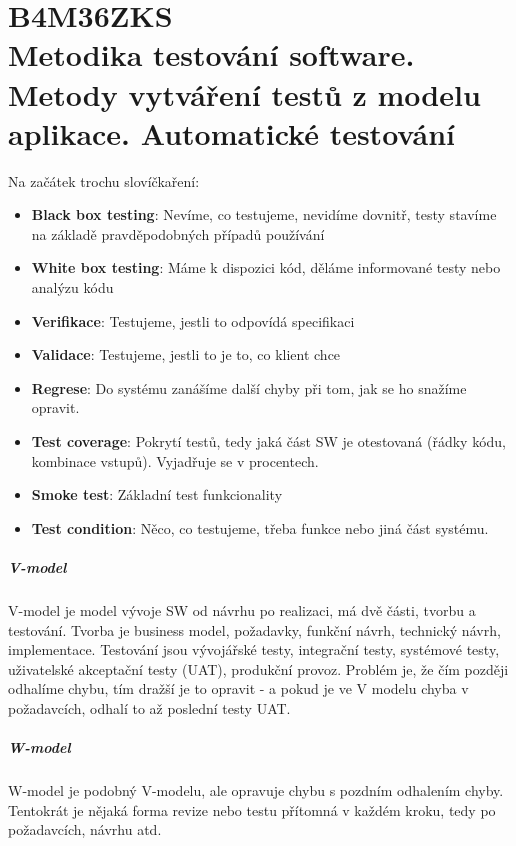\chapter[Zajištění kvality software]{B4M36ZKS \\[1ex]\Large{Metodika testování software. Metody vytváření testů z modelu aplikace. Automatické testování}}

Na začátek trochu slovíčkaření:

\begin{itemize}
\item \textbf{Black box testing}: Nevíme, co testujeme, nevidíme dovnitř, testy stavíme na základě pravděpodobných případů používání
\item \textbf{White box testing}: Máme k dispozici kód, děláme informované testy nebo analýzu kódu
\item \textbf{Verifikace}: Testujeme, jestli to odpovídá specifikaci
\item \textbf{Validace}: Testujeme, jestli to je to, co klient chce
\item \textbf{Regrese}: Do systému zanášíme další chyby při tom, jak se ho snažíme opravit.
\item \textbf{Test coverage}: Pokrytí testů, tedy jaká část SW je otestovaná (řádky kódu, kombinace vstupů). Vyjadřuje se v procentech.
\item \textbf{Smoke test}: Základní test funkcionality
\item \textbf{Test condition}: Něco, co testujeme, třeba funkce nebo jiná část systému. 
\end{itemize}

\paragraph{V-model} V-model je model vývoje SW od návrhu po realizaci, má dvě části, tvorbu a testování. Tvorba je business model, požadavky, funkční návrh, technický návrh, implementace. Testování jsou vývojářské testy, integrační testy, systémové testy, uživatelské akceptační testy (UAT), produkční provoz. Problém je, že čím později odhalíme chybu, tím dražší je to opravit - a pokud je ve V modelu chyba v požadavcích, odhalí to až poslední testy UAT.

\paragraph{W-model} W-model je podobný V-modelu, ale opravuje chybu s pozdním odhalením chyby. Tentokrát je nějaká forma revize nebo testu přítomná v každém kroku, tedy po požadavcích, návrhu atd.

